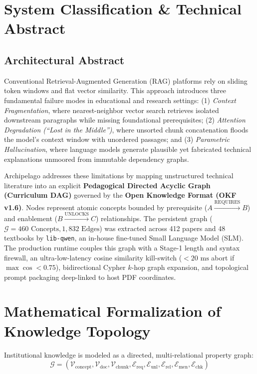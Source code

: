 \documentclass[10pt,a4paper]{article}
\begin{document}
\vspace{-0.1cm}
\section{System Classification \& Technical Abstract}
\subsection{Architectural Abstract}
Conventional Retrieval-Augmented Generation (RAG) platforms rely on sliding token windows and flat vector similarity. This approach introduces three fundamental failure modes in educational and research settings: (1) \textit{Context Fragmentation}, where nearest-neighbor vector search retrieves isolated downstream paragraphs while missing foundational prerequisites; (2) \textit{Attention Degradation (``Lost in the Middle'')}, where unsorted chunk concatenation floods the model's context window with unordered passages; and (3) \textit{Parametric Hallucination}, where language models generate plausible yet fabricated technical explanations unmoored from immutable dependency graphs.

Archipelago addresses these limitations by mapping unstructured technical literature into an explicit \textbf{Pedagogical Directed Acyclic Graph (Curriculum DAG)} governed by the \textbf{Open Knowledge Format (OKF v1.6)}. Nodes represent atomic concepts bounded by prerequisite ($A \xrightarrow{\text{REQUIRES}} B$) and enablement ($B \xrightarrow{\text{UNLOCKS}} C$) relationships. The persistent graph ($\mathcal{G} = 460\text{ Concepts}, 1,832\text{ Edges}$) was extracted across 412 papers and 48 textbooks by \texttt{lib-qwen}, an in-house fine-tuned Small Language Model (SLM). The production runtime couples this graph with a Stage-1 length and syntax firewall, an ultra-low-latency cosine similarity kill-switch ($<20\text{ ms}$ abort if $\max \cos < 0.75$), bidirectional Cypher $k$-hop graph expansion, and topological prompt packaging deep-linked to host PDF coordinates.

\newpage
\section{Mathematical Formalization of Knowledge Topology}
Institutional knowledge is modeled as a directed, multi-relational property graph:
\begin{equation}
\mathcal{G} = (\mathcal{V}_{\text{concept}}, \mathcal{V}_{\text{doc}}, \mathcal{V}_{\text{chunk}}, \mathcal{E}_{\text{req}}, \mathcal{E}_{\text{unl}}, \mathcal{E}_{\text{rel}}, \mathcal{E}_{\text{men}}, \mathcal{E}_{\text{chk}})
\end{equation}
\end{document}
